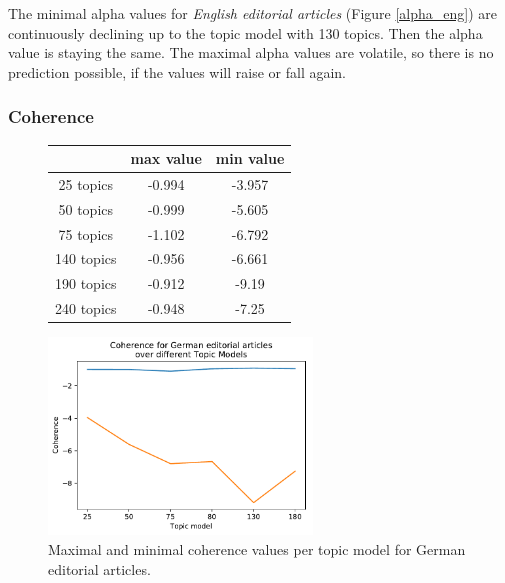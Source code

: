 The minimal alpha values for \textit{English editorial articles} (Figure \ref{alpha_eng}) are continuously declining up to the topic model with 130 topics. Then the alpha value is staying the same. The maximal alpha values are volatile, so there is no prediction possible, if the values will raise or fall again.

\subsubsection{Coherence}
\begin{figure}
	\begin{minipage}{0.5\textwidth}
		\centering
		\begin{tabular}[t]{c|cc}
			&max value & min value\\
			\hline
			25 topics&-0.994&-3.957\\
			50 topics&-0.999&-5.605\\
			75 topics&-1.102&-6.792\\
			140 topics&	-0.956&-6.661\\
			190 topics &-0.912&-9.19\\
			240 topics&	-0.948&-7.25\\
		\end{tabular}
	\end{minipage}%
	\begin{minipage}{0.5\textwidth}
		\centering
		\includegraphics[width=7cm]{gfx/Eval_IC/German_Editorial_Coherence.pdf}
	\end{minipage}
\caption[]{Maximal and minimal coherence values per topic model for German editorial articles.}
\label{eval:coherence_ger}
\end{figure}
	
